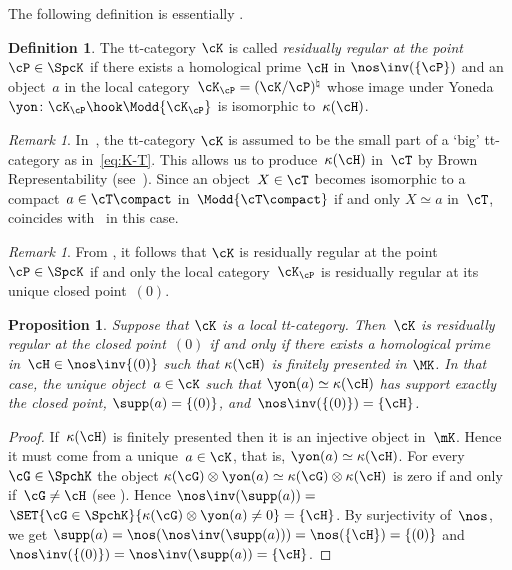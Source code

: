 \documentclass[11pt]{amsart}
\numberwithin{equation}{section} %
\theoremstyle{plain}
\newtheorem{prop}[equation]{Proposition}
\theoremstyle{definition}
\newtheorem{dfn}[equation]{Definition}
\theoremstyle{remark}
\newtheorem{rem}[equation]{Remark}
\begin{document}
The following definition is essentially \cite[Definition~2.1]{VanRooy26}. 
\begin{dfn}\label{dfn:resreg}
The tt-category $\cK$ is called \emph{residually regular at the point ${\cP \in \SpcK}$} if there exists a homological prime $\cH$ in $\nos\inv(\{\cP\})$ and an object~$a$ in the local category~$\cK_{\cP}=(\cK/\cP)^\natural$ whose image under Yoneda $\yon\colon \cK_\cP\hook\Modd{\cK_\cP}$ is isomorphic to~$\kappa(\cH)$.
\end{dfn}
%
\begin{rem}
In~\cite{VanRooy26}, the tt-category $\cK$ is assumed to be the small part of a `big' tt-category as in~\eqref{eq:K-T}. This allows us to produce~$\kappa(\cH)$ in~$\cT$ by Brown Representability (see~\cite[Corollary~1.9]{Krause00}). Since an object~$X\in\cT$ becomes isomorphic to a compact~$a\in\cT\compact$ in~$\Modd{\cT\compact}$ if and only $X\simeq a$ in~$\cT$,  coincides with~\cite[Definition~2.1]{VanRooy26} in this case.
\end{rem}

\begin{rem}\label{rem:resreg-stalklocal}
From , it follows that $\cK$ is residually regular at the point ${\cP \in \SpcK}$ if and only the local category~$\cK_{\cP}$ is residually regular at its unique closed point~$(0)$. 
\end{rem}

%
\begin{prop}
\label{prop:residueiscompact}%
Suppose that $\cK$ is a local tt-category.
Then~$\cK$ is residually regular at the closed point~$(0)$ if and only if there exists a homological prime in~$\cH\in\nos \inv \{(0) \}$ such that $\kappa(\cH)$ is finitely presented in $\MK$.
In that case, the unique object~$a\in\cK$ such that $\yon(a)\simeq \kappa(\cH)$ has support exactly the closed point, $\supp(a) = \{ (0)\}$, and~$\nos\inv(\{(0)\})=\{\cH\}$.
\end{prop}
\begin{proof}
If~$\kappa(\cH)$ is finitely presented then it is an injective object in~$\mK$. Hence it must come from a unique~$a \in \cK$, that is, $\yon(a) \simeq\kappa(\cH)$.
For every~$\cG\in\SpchK$ the object $\kappa(\cG)\otimes \yon(a)\simeq\kappa(\cG)\otimes\kappa(\cH)$ is zero if and only if~$\cG\neq \cH$ (see \cite[Proposition~5.3]{Balmer20a}). Hence $\nos\inv(\supp(a))=$ $\SET{\cG\in\SpchK}{\kappa(\cG)\otimes \yon(a)\neq 0}=\{\cH\}$. By surjectivity of~$\nos$, we get $\supp(a)=\nos(\nos\inv(\supp(a)))=\nos(\{\cH\})=\{(0)\}$ and~$\nos\inv(\{(0)\})=\nos\inv(\supp(a))=\{\cH\}$.
\end{proof}
\end{document}
